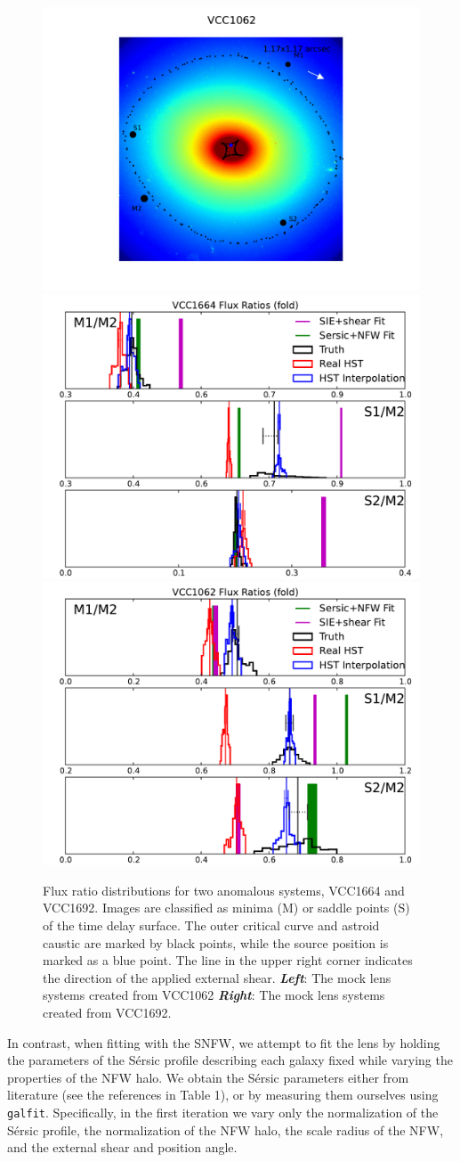 \begin{figure}
	\includegraphics[trim=3cm 0cm 3cm 0cm,clip,width=.24\textwidth]{./figures_sls/kappamap_VCC1062_fold_withshear-eps-converted-to.pdf}
	\includegraphics[clip,trim=.85cm 0cm .1cm
	0cm,width=0.48\linewidth,keepaspectratio]{./figures_sls/VCC1664_fold_fluxratios-eps-converted-to.pdf}
	\includegraphics[clip,trim=.9cm 0cm .2cm
	0cm,width=0.48\linewidth,keepaspectratio]{./figures_sls/VCC1062_fold_fluxratios-eps-converted-to.pdf}
	\caption{\label{fig:fluxratios2} Flux ratio distributions for two anomalous systems, VCC1664 and VCC1692. Images are classified as minima (M) or saddle points (S) of the time delay surface. The outer critical curve and astroid caustic are marked by black points, while the source position is marked as a blue point. The line in the upper right corner indicates the direction of the applied external shear. {\bf{\emph{Left}}}: The mock lens systems created from VCC1062 {\bf{\emph{Right}}}: The mock lens systems created from VCC1692.} 
\end{figure}
In contrast, when fitting with the SNFW, we attempt to fit the lens by holding the parameters of the S{\'e}rsic profile describing each galaxy fixed while varying the properties of the NFW halo. We obtain the S{\'e}rsic parameters either from literature (see the references in Table 1), or by measuring them ourselves using {\tt {galfit}}. Specifically, in the first iteration we vary only the normalization of the S{\'e}rsic profile, the normalization of the NFW halo, the scale radius of the NFW, and the external shear and position angle. 

